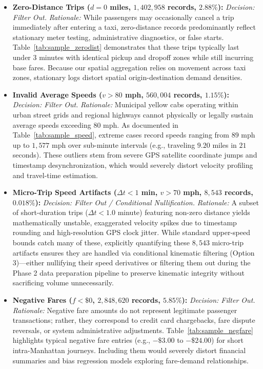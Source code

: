 \documentclass[11pt,a4paper]{article}
\begin{document}
\begin{itemize}
    \item \textbf{Zero-Distance Trips ($d = 0$ miles, $1,402,958$ records, $2.88\%$):} 
    \textit{Decision: Filter Out.} 
    \textit{Rationale:} While passengers may occasionally cancel a trip immediately after entering a taxi, zero-distance records predominantly reflect stationary meter testing, administrative diagnostics, or false starts. Table~\ref{tab:sample_zerodist} demonstrates that these trips typically last under $3$ minutes with identical pickup and dropoff zones while still incurring base fares. Because our spatial aggregation relies on movement across taxi zones, stationary logs distort spatial origin-destination demand densities.

    \item \textbf{Invalid Average Speeds ($v > 80$ mph, $560,004$ records, $1.15\%$):} 
    \textit{Decision: Filter Out.} 
    \textit{Rationale:} Municipal yellow cabs operating within urban street grids and regional highways cannot physically or legally sustain average speeds exceeding $80$ mph. As documented in Table~\ref{tab:sample_speed}, extreme cases record speeds ranging from $89$ mph up to $1,577$ mph over sub-minute intervals (e.g., traveling $9.20$ miles in $21$ seconds). These outliers stem from severe GPS satellite coordinate jumps and timestamp desynchronization, which would severely distort velocity profiling and travel-time estimation.

    \item \textbf{Micro-Trip Speed Artifacts ($\Delta t < 1$ min, $v > 70$ mph, $8,543$ records, $0.018\%$):} 
    \textit{Decision: Filter Out / Conditional Nullification.} 
    \textit{Rationale:} A subset of short-duration trips ($\Delta t < 1.0$ minute) featuring non-zero distance yields mathematically unstable, exaggerated velocity spikes due to timestamp rounding and high-resolution GPS clock jitter. While standard upper-speed bounds catch many of these, explicitly quantifying these $8,543$ micro-trip artifacts ensures they are handled via conditional kinematic filtering (Option 3)—either nullifying their speed derivatives or filtering them out during the Phase 2 data preparation pipeline to preserve kinematic integrity without sacrificing volume unnecessarily.

    \item \textbf{Negative Fares ($f < \$0$, $2,848,620$ records, $5.85\%$):} 
    \textit{Decision: Filter Out.} 
    \textit{Rationale:} Negative fare amounts do not represent legitimate passenger transactions; rather, they correspond to credit card chargebacks, fare dispute reversals, or system administrative adjustments. Table~\ref{tab:sample_negfare} highlights typical negative fare entries (e.g., $-\$3.00$ to $-\$24.00$) for short intra-Manhattan journeys. Including them would severely distort financial summaries and bias regression models exploring fare-demand relationships.


\end{itemize}
\end{document}

